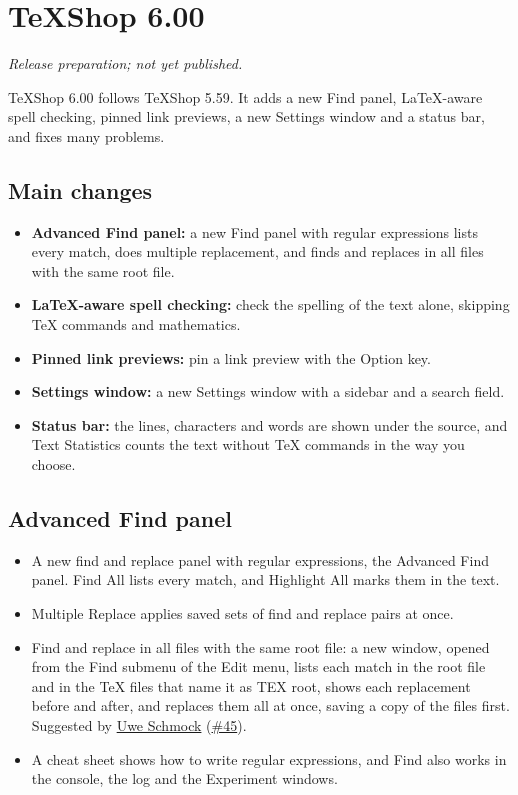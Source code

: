 \documentclass[11pt,letterpaper]{article}
\begin{document}
\section{TeXShop 6.00}

\noindent\textit{Release preparation; not yet published.}\par

TeXShop 6.00 follows TeXShop 5.59. It adds a new Find panel, LaTeX-aware spell checking, pinned link previews, a new Settings window and a status bar, and fixes many problems.


\subsection{Main changes}

\begin{itemize}
\item \textbf{Advanced Find panel:} a new Find panel with regular expressions lists every match, does multiple replacement, and finds and replaces in all files with the same root file.
\item \textbf{LaTeX-aware spell checking:} check the spelling of the text alone, skipping TeX commands and mathematics.
\item \textbf{Pinned link previews:} pin a link preview with the Option key.
\item \textbf{Settings window:} a new Settings window with a sidebar and a search field.
\item \textbf{Status bar:} the lines, characters and words are shown under the source, and Text Statistics counts the text without TeX commands in the way you choose.
\end{itemize}

\subsection{Advanced Find panel}

\begin{itemize}
\item A new find and replace panel with regular expressions, the Advanced Find panel. Find All lists every match, and Highlight All marks them in the text.
\item Multiple Replace applies saved sets of find and replace pairs at once.
\item Find and replace in all files with the same root file: a new window, opened from the Find submenu of the Edit menu, lists each match in the root file and in the TeX files that name it as TEX root, shows each replacement before and after, and replaces them all at once, saving a copy of the files first. Suggested by \href{https://github.com/Uwe-Schmock}{Uwe Schmock} (\href{https://github.com/TeXShopProject/TeXShop/issues/45}{\#45}).
\item A cheat sheet shows how to write regular expressions, and Find also works in the console, the log and the Experiment windows.
\end{itemize}
\end{document}
